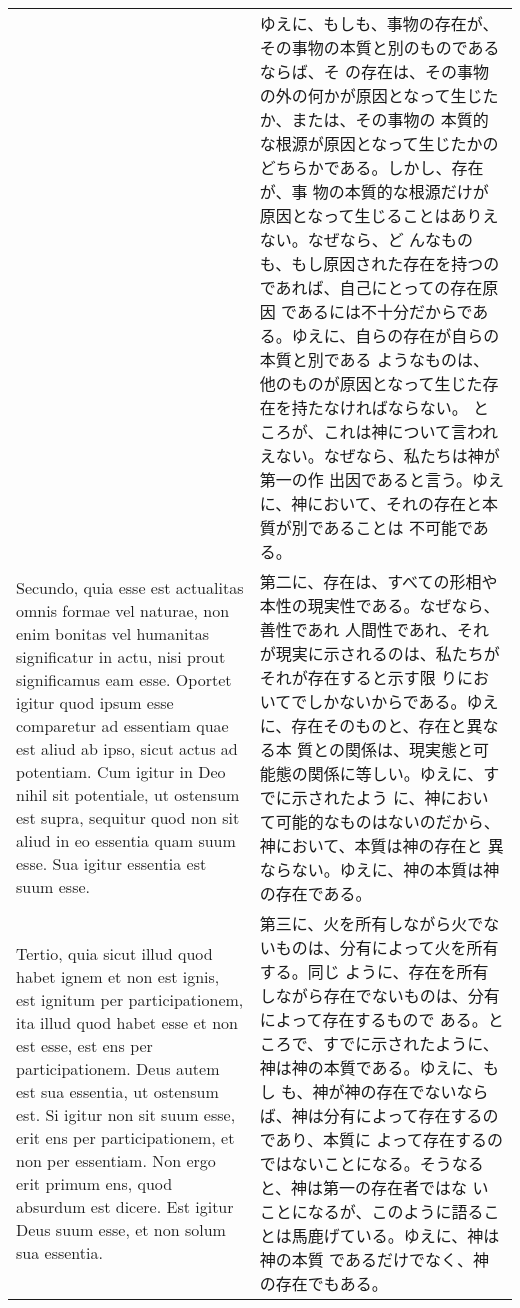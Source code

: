 \documentclass[10pt]{jsarticle}
\begin{document}
\begin{longtable}{p{21em}p{21em}}
&

ゆえに、もしも、事物の存在が、その事物の本質と別のものであるならば、そ
の存在は、その事物の外の何かが原因となって生じたか、または、その事物の
本質的な根源が原因となって生じたかのどちらかである。しかし、存在が、事
物の本質的な根源だけが原因となって生じることはありえない。なぜなら、ど
んなものも、もし原因された存在を持つのであれば、自己にとっての存在原因
であるには不十分だからである。ゆえに、自らの存在が自らの本質と別である
ようなものは、他のものが原因となって生じた存在を持たなければならない。
ところが、これは神について言われえない。なぜなら、私たちは神が第一の作
出因であると言う。ゆえに、神において、それの存在と本質が別であることは
不可能である。

\\

Secundo, quia esse est actualitas omnis formae vel naturae, non enim
bonitas vel humanitas significatur in actu, nisi prout significamus
eam esse.  Oportet igitur quod ipsum esse comparetur ad essentiam quae
est aliud ab ipso, sicut actus ad potentiam.  Cum igitur in Deo nihil
sit potentiale, ut ostensum est supra, sequitur quod non sit aliud in
eo essentia quam suum esse.  Sua igitur essentia est suum esse.

&


第二に、存在は、すべての形相や本性の現実性である。なぜなら、善性であれ
人間性であれ、それが現実に示されるのは、私たちがそれが存在すると示す限
りにおいてでしかないからである。ゆえに、存在そのものと、存在と異なる本
質との関係は、現実態と可能態の関係に等しい。ゆえに、すでに示されたよう
に、神において可能的なものはないのだから、神において、本質は神の存在と
異ならない。ゆえに、神の本質は神の存在である。

\\


Tertio, quia sicut illud quod habet ignem et non est ignis, est
ignitum per participationem, ita illud quod habet esse et non est
esse, est ens per participationem.  Deus autem est sua essentia, ut
ostensum est.  Si igitur non sit suum esse, erit ens per
participationem, et non per essentiam.  Non ergo erit primum ens, quod
absurdum est dicere.  Est igitur Deus suum esse, et non solum sua
essentia.


&

第三に、火を所有しながら火でないものは、分有によって火を所有する。同じ
ように、存在を所有しながら存在でないものは、分有によって存在するもので
ある。ところで、すでに示されたように、神は神の本質である。ゆえに、もし
も、神が神の存在でないならば、神は分有によって存在するのであり、本質に
よって存在するのではないことになる。そうなると、神は第一の存在者ではな
いことになるが、このように語ることは馬鹿げている。ゆえに、神は神の本質
であるだけでなく、神の存在でもある。



\end{longtable}
\end{document}
